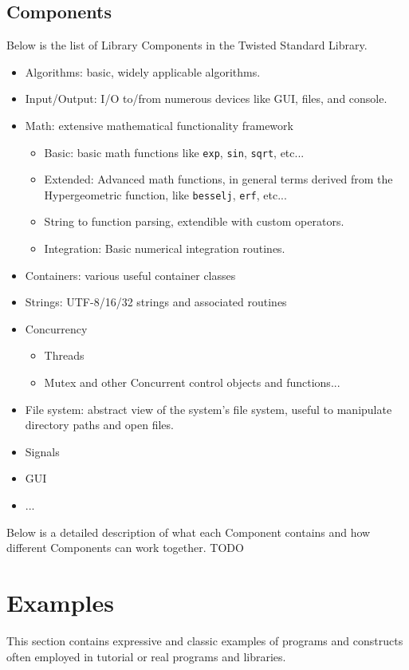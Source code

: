 \documentclass[a4paper,11pt]{article}
\newcommand{\tcode}[1]{\texttt{#1}}
\begin{document}
  \subsection{Components}

Below is the list of Library Components in the Twisted Standard Library.
\begin{itemize}
  \item Algorithms: basic, widely applicable algorithms.
  \item Input/Output: I/O to/from numerous devices like GUI, files, and console.
  \item Math: extensive mathematical functionality framework
  \begin{itemize}
    \item Basic: basic math functions like \tcode{exp}, \tcode{sin}, \tcode{sqrt}, etc...
    \item Extended: Advanced math functions, in general terms derived from the Hypergeometric function, like \tcode{besselj}, \tcode{erf}, etc...
    \item String to function parsing, extendible with custom operators.
    \item Integration: Basic numerical integration routines.
  \end{itemize}
  \item Containers: various useful container classes
  \item Strings: UTF-8/16/32 strings and associated routines
  \item Concurrency
  \begin{itemize}
    \item Threads
    \item Mutex and other Concurrent control objects and functions...
  \end{itemize}
  \item File system: abstract view of the system's file system, useful to manipulate directory paths and open files.
  \item Signals
  \item GUI
  \item ...
\end{itemize}
Below is a detailed description of what each Component contains and how different Components can work together.
TODO

\section{Examples}
This section contains expressive and classic examples of programs and constructs often employed in tutorial or real programs and libraries.
\end{document}
